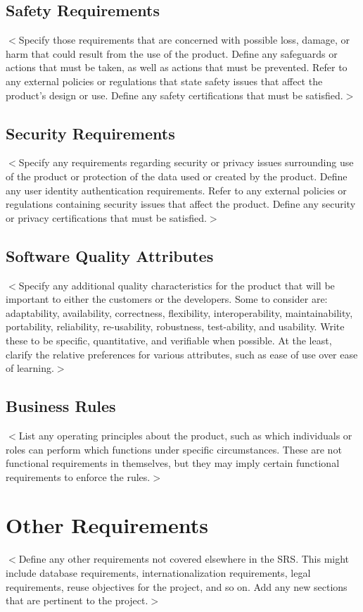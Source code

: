 \documentclass{scrreprt}
\begin{document}
\section{Safety Requirements}
$<$Specify those requirements that are concerned with possible loss, damage, or 
harm that could result from the use of the product. Define any safeguards or 
actions that must be taken, as well as actions that must be prevented. Refer to 
any external policies or regulations that state safety issues that affect the 
product’s design or use. Define any safety certifications that must be 
satisfied.$>$

\section{Security Requirements}
$<$Specify any requirements regarding security or privacy issues surrounding use 
of the product or protection of the data used or created by the product. Define 
any user identity authentication requirements. Refer to any external policies or 
regulations containing security issues that affect the product. Define any 
security or privacy certifications that must be satisfied.$>$

\section{Software Quality Attributes}
$<$Specify any additional quality characteristics for the product that will be 
important to either the customers or the developers. Some to consider are: 
adaptability, availability, correctness, flexibility, interoperability, 
maintainability, portability, reliability, re-usability, robustness, test-ability, 
and usability. Write these to be specific, quantitative, and verifiable when 
possible. At the least, clarify the relative preferences for various attributes, 
such as ease of use over ease of learning.$>$

\section{Business Rules}
$<$List any operating principles about the product, such as which individuals or 
roles can perform which functions under specific circumstances. These are not 
functional requirements in themselves, but they may imply certain functional 
requirements to enforce the rules.$>$


\chapter{Other Requirements}
$<$Define any other requirements not covered elsewhere in the SRS. This might 
include database requirements, internationalization requirements, legal 
requirements, reuse objectives for the project, and so on. Add any new sections 
that are pertinent to the project.$>$
\end{document}
